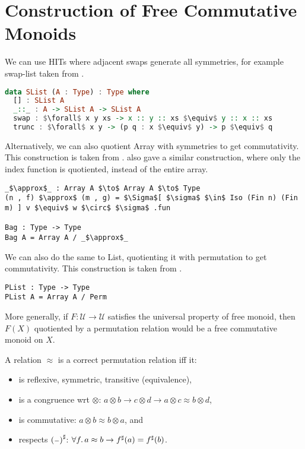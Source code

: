 \section{Construction of Free Commutative Monoids}
\label{sec:commutative-monoids}

We can use HITs where adjacent swaps generate all symmetries,
for example swap-list taken from \cite{Choudhury_2023}.

\begin{lstlisting}[language=Haskell]
data SList (A : Type) : Type where
  [] : SList A
  _::_ : A -> SList A -> SList A
  swap : $\forall$ x y xs -> x :: y :: xs $\equiv$ y :: x :: xs 
  trunc : $\forall$ x y -> (p q : x $\equiv$ y) -> p $\equiv$ q
\end{lstlisting}

\noindent
Alternatively, we can also quotient Array with symmetries to get commutativity.
This construction is taken from \cite{Choudhury_2023}. \cite{joram_et_al:LIPIcs.ITP.2023.20}
also gave a similar construction, where only the index function is quotiented, instead of
the entire array.

\begin{lstlisting}
_$\approx$_ : Array A $\to$ Array A $\to$ Type
(n , f) $\approx$ (m , g) = $\Sigma$[ $\sigma$ $\in$ Iso (Fin n) (Fin m) ] v $\equiv$ w $\circ$ $\sigma$ .fun

Bag : Type -> Type
Bag A = Array A / _$\approx$_
\end{lstlisting}

\noindent
We can also do the same to List, quotienting it with permutation to get commutativity.
This construction is taken from \cite{joram_et_al:LIPIcs.ITP.2023.20}.

\begin{lstlisting}
PList : Type -> Type
PList A = Array A / Perm
\end{lstlisting}

More generally, if $F : \mathcal{U} \to \mathcal{U}$ satisfies the universal property of free monoid,
then $F(X)$ quotiented by a permutation relation would be a free commutative monoid on $X$.

A relation $\approx$ is a correct permutation relation iff it:
\begin{itemize}
    \item is reflexive, symmetric, transitive (equivalence),
    \item is a congruence wrt $\otimes$: $a \otimes b \to c \otimes d \to a \otimes c \approx b \otimes d$,
    \item is commutative: $a \otimes b \approx b \otimes a$, and
    \item respects ${({\scriptstyle{-}})}^{\sharp}$: $\forall f. \, a \approx b \to {f}^{\sharp}(a) = {f}^{\sharp}(b)$.
\end{itemize}

